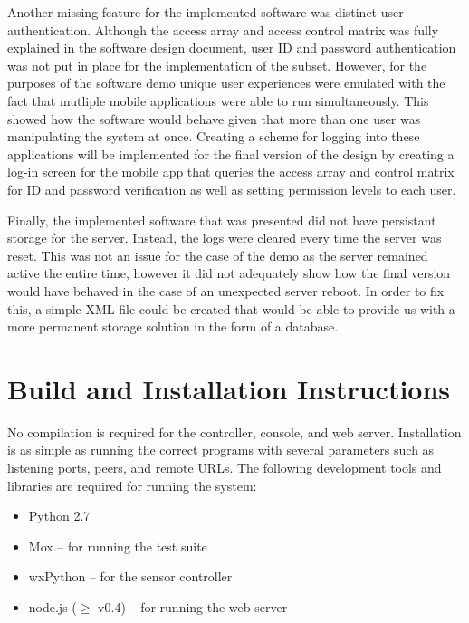 \documentclass{article}
\begin{document}
Another missing feature for the implemented software was distinct user
authentication. Although the access array and access control matrix was fully
explained in the software design document, user ID and password authentication
was not put in place for the implementation of the subset. However, for the
purposes of the software demo unique user experiences were emulated with the
fact that mutliple mobile applications were able to run simultaneously. This
showed how the software would behave given that more than one user was
manipulating the system at once. Creating a scheme for logging into these 
applications will be implemented for the final version of the design by 
creating a log-in screen for the mobile app that queries the access array
and control matrix for ID and password verification as well as setting permission
levels to each user.

Finally, the implemented software that was presented did not have persistant
storage for the server. Instead, the logs were cleared every time the server
was reset. This was not an issue for the case of the demo as the server remained
active the entire time, however it did not adequately show how the final version
would have behaved in the case of an unexpected server reboot. In order to fix
this, a simple XML file could be created that would be able to provide us with a
more permanent storage solution in the form of a database.

\section{Build and Installation Instructions}

No compilation is required for the controller, console, and web server.
Installation is as simple as running the correct programs with several
parameters such as listening ports, peers, and remote URLs. The following
development tools and libraries are required for running the
system:
\begin{itemize}
\item Python 2.7 
\item Mox -- for running the test suite
\item wxPython -- for the sensor controller
\item node.js ($\ge$ v0.4) -- for running the web server
\end{itemize}
\end{document}
